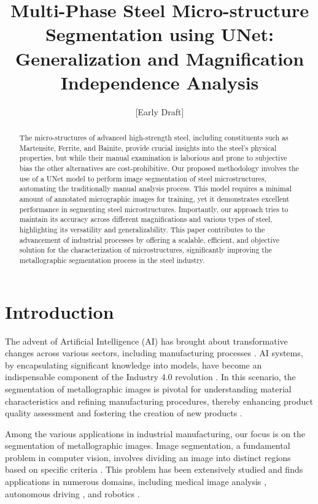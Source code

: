 \documentclass[]{article}
\title{Multi-Phase Steel Micro-structure Segmentation using UNet: Generalization and Magnification Independence Analysis}
\author{[Early Draft]}
\begin{document}
\maketitle

\begin{abstract}
	
The micro-structures of advanced high-strength steel, including constituents such as Martensite, Ferrite, and Bainite, provide crucial insights into the steel's physical properties, but while their manual examination is laborious and prone to subjective bias the other alternatives are cost-prohibitive. Our proposed methodology involves the use of a UNet model to perform image segmentation of steel microstructures, automating the traditionally manual analysis process. This model requires a minimal amount of annotated micrographic images for training, yet it demonstrates excellent performance in segmenting steel microstructures. Importantly, our approach tries to maintain its accuracy across different magnifications and various types of steel, highlighting its versatility and generalizability. This paper contributes to the advancement of industrial processes by offering a scalable, efficient, and objective solution for the characterization of microstructures, significantly improving the metallographic segmentation process in the steel industry.

\end{abstract}

\section{Introduction}

The advent of Artificial Intelligence (AI) has brought about transformative changes across various sectors, including manufacturing processes \cite{russel2010}. AI systems, by encapsulating significant knowledge into models, have become an indispensable component of the Industry 4.0 revolution \cite{lasi2014industry}. In this scenario, the segmentation of metallographic images is pivotal for understanding material characteristics and refining manufacturing procedures, thereby enhancing product quality assessment and fostering the creation of new products \cite{gonzalez2008digital, cv_algandapp}.

Among the various applications in industrial manufacturing, our focus is on the segmentation of metallographic images. Image segmentation, a fundamental problem in computer vision, involves dividing an image into distinct regions based on specific criteria \cite{HARALICK1985100}. This problem has been extensively studied and finds applications in numerous domains, including medical image analysis \cite{Litjens_2017, shen2017}, autonomous driving \cite{chen2017deeplab}, and robotics \cite{garciagarcia2017review}.
\end{document}
